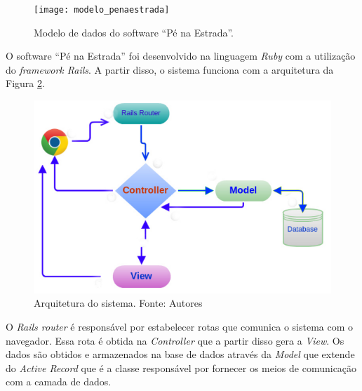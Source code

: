    \begin{figure}[!htb]
    \centering
    \texttt{[image: modelo\_penaestrada]}
    \caption[Modelo de dados do \textit{software} “Pé na Estrada”]{Modelo de dados do software “Pé na Estrada”.}
    \label{fig:modelo_penaestrada}
    \end{figure}
  
    O software ``Pé na Estrada'' foi desenvolvido na linguagem \textit{Ruby} com a utilização do \textit{framework Rails}. 
    A partir disso, o sistema funciona com a arquitetura da Figura \ref{fig:arquitetura}.

    \begin{figure}[!htb]
    \centering
    \includegraphics[scale = 0.5]{figuras/arquiteturarails.png}
    \caption[Arquitetura do \textit{software} “Pé na Estrada”]{Arquitetura do sistema. Fonte: Autores}
    \label{fig:arquitetura}

    \end{figure}

    O \textit{Rails router} é responsável por estabelecer rotas que comunica o sistema com o navegador. Essa rota é obtida
    na \textit{Controller} que a partir disso gera a \textit{View}. Os dados são obtidos e armazenados na base de dados através da \textit{Model}
    que extende do \textit{Active Record} que é a classe responsável por fornecer os meios de comunicação com a camada de dados.

   
%     
  
